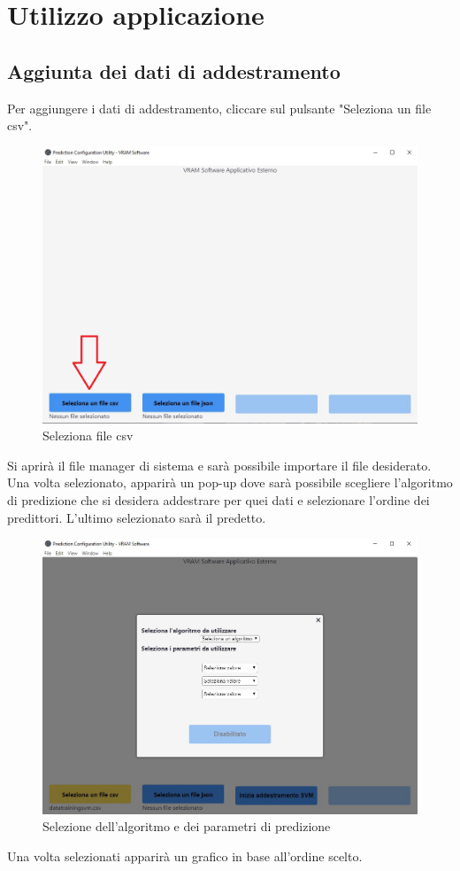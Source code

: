 \section{Utilizzo applicazione}
	\subsection{Aggiunta dei dati di addestramento}
	Per aggiungere i dati di addestramento, cliccare sul pulsante "Seleziona un file csv".
	\begin{figure}[H] 	
		\begin{center}
			\includegraphics[width=\linewidth]{img/1.png}
		\end{center}
		\caption{Seleziona file csv}	
	\end{figure}
	Si aprirà il file manager di sistema e sarà possibile importare il file desiderato. Una volta selezionato, apparirà un pop-up dove sarà possibile scegliere l'algoritmo di predizione che si desidera addestrare per quei dati e selezionare l'ordine dei predittori. L'ultimo selezionato sarà il predetto.
	\begin{figure}[H] 	
		\begin{center}
			\includegraphics[width=\linewidth]{img/2.jpg}
		\end{center}
		\caption{Selezione dell'algoritmo e dei parametri di predizione}	
	\end{figure}
	Una volta selezionati apparirà un grafico in base all'ordine scelto.
